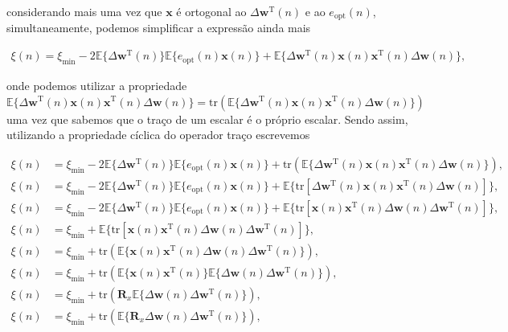 \documentclass[a4paper,10pt]{article}
\begin{document}
\begin{enumerate}
\begin{enumerate}
						considerando mais uma vez que $\mathbf{x}$ é ortogonal ao $\Delta \mathbf{w}^{\text{T}}(n)$ e ao $e_{\text{opt}}(n)$, simultaneamente, podemos simplificar a expressão ainda mais 

						\begin{align}
							\xi(n) = \xi_{\text{min}} - 2 \mathbb{E}\{\Delta \mathbf{w}^{\text{T}}(n)\} \mathbb{E}\{e_{\text{opt}}(n) \mathbf{x}(n)\} + \mathbb{E}\{\Delta \mathbf{w}^{\text{T}}(n) \mathbf{x}(n) \mathbf{x}^{\text{T}}(n) \Delta \mathbf{w}(n)\},
						\end{align}

						onde podemos utilizar a propriedade $\mathbb{E}\{\Delta \mathbf{w}^{\text{T}}(n) \mathbf{x}(n) \mathbf{x}^{\text{T}}(n) \Delta \mathbf{w}(n)\} = \text{tr}(\mathbb{E}\{\Delta \mathbf{w}^{\text{T}}(n) \mathbf{x}(n) \mathbf{x}^{\text{T}}(n) \Delta \mathbf{w}(n)\})$ uma vez
						que sabemos que o traço de um escalar é o próprio escalar. Sendo assim, utilizando a propriedade cíclica do operador traço escrevemos

						\begin{align}
							\xi(n) &= \xi_{\text{min}} - 2 \mathbb{E}\{\Delta \mathbf{w}^{\text{T}}(n)\} \mathbb{E}\{e_{\text{opt}}(n) \mathbf{x}(n)\} + \text{tr}(\mathbb{E}\{\Delta \mathbf{w}^{\text{T}}(n) \mathbf{x}(n) \mathbf{x}^{\text{T}}(n) \Delta \mathbf{w}(n)\}), \\
							\xi(n) &= \xi_{\text{min}} - 2 \mathbb{E}\{\Delta \mathbf{w}^{\text{T}}(n)\} \mathbb{E}\{e_{\text{opt}}(n)\mathbf{x}(n)\} + \mathbb{E}\{\text{tr}[\Delta \mathbf{w}^{\text{T}}(n) \mathbf{x}(n) \mathbf{x}^{\text{T}}(n) \Delta \mathbf{w}(n)]\}, \\
							\xi(n) &= \xi_{\text{min}} - 2 \mathbb{E}\{\Delta \mathbf{w}^{\text{T}}(n)\} \mathbb{E}\{e_{\text{opt}}(n)\mathbf{x}(n)\} + \mathbb{E}\{\text{tr}[\mathbf{x}(n) \mathbf{x}^{\text{T}}(n) \Delta \mathbf{w}(n) \Delta \mathbf{w}^{\text{T}}(n)]\}, \\
							\xi(n) &= \xi_{\text{min}} + \mathbb{E}\{\text{tr}[\mathbf{x}(n) \mathbf{x}^{\text{T}}(n) \Delta \mathbf{w}(n) \Delta \mathbf{w}^{\text{T}}(n)]\}, \\
							\xi(n) &= \xi_{\text{min}} + \text{tr}(\mathbb{E}\{\mathbf{x}(n) \mathbf{x}^{\text{T}}(n) \Delta \mathbf{w}(n) \Delta \mathbf{w}^{\text{T}}(n)\}), \\
							\xi(n) &= \xi_{\text{min}} + \text{tr}(\mathbb{E}\{\mathbf{x}(n) \mathbf{x}^{\text{T}}(n)\} \mathbb{E}\{\Delta \mathbf{w}(n) \Delta \mathbf{w}^{\text{T}}(n)\}), \\
							\xi(n) &= \xi_{\text{min}} + \text{tr}(\mathbf{R}_{x} \mathbb{E}\{\Delta \mathbf{w}(n) \Delta \mathbf{w}^{\text{T}}(n)\}), \\
							\xi(n) &= \xi_{\text{min}} + \text{tr}(\mathbb{E}\{\mathbf{R}_{x} \Delta \mathbf{w}(n) \Delta \mathbf{w}^{\text{T}}(n)\}), 
						\end{align}


\end{enumerate}
\end{enumerate}
\end{document}
